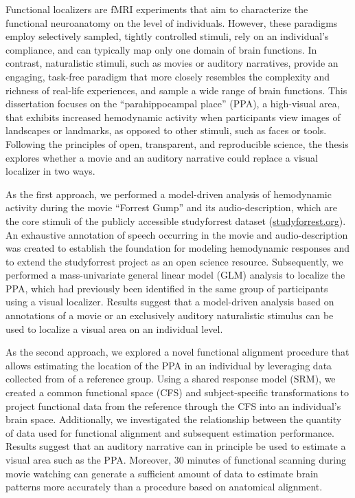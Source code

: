 
Functional localizers are fMRI experiments that aim to characterize the
functional neuroanatomy on the level of individuals.
%
However, these paradigms employ selectively sampled, tightly controlled
stimuli, rely on an individual's compliance, and can typically map only one
domain of brain functions.
In contrast, naturalistic stimuli, such as movies or auditory narratives,
provide an engaging, task-free paradigm that more closely resembles the
complexity and richness of real-life experiences, and sample a wide range of
brain functions.
This dissertation focuses on the ``parahippocampal place'' (PPA), a high-visual
area, that exhibits increased hemodynamic activity when participants view
images of landscapes or landmarks, as opposed to other stimuli, such as faces
or tools.
Following the principles of open, transparent, and reproducible science, the
thesis explores whether a movie and an auditory narrative could replace a
visual localizer in two ways.

As the first approach, we performed a model-driven analysis of hemodynamic
activity during the movie ``Forrest Gump'' and its audio-description, which are
the core stimuli of the publicly accessible studyforrest dataset
(\href{www.studyforrest.org}{\url{studyforrest.org}}).
%
An exhaustive annotation of speech occurring in the movie and audio-description
was created to establish the foundation for modeling hemodynamic responses and
to extend the studyforrest project as an open science resource.
Subsequently, we performed a mass-univariate general linear model (GLM)
analysis to localize the PPA, which had previously been identified in the same
group of participants using a visual localizer.
Results suggest that a model-driven analysis based on annotations of a movie or
an exclusively auditory naturalistic stimulus can be used to localize a visual
area on an individual level.

As the second approach, we explored a novel functional alignment procedure that
allows estimating the location of the PPA in an individual by leveraging data
collected from of a reference group.
%
Using a shared response model (SRM), we created a common functional space (CFS)
and subject-specific transformations to project functional data from the
reference through the CFS into an individual's brain space.
%
Additionally, we investigated the relationship between the quantity of data
used for functional alignment and subsequent estimation performance.
%
Results suggest that an auditory narrative can in principle be used to estimate
a visual area such as the PPA.
%
Moreover, 30 minutes of functional scanning during movie watching can generate
a sufficient amount of data to estimate brain patterns more accurately than a
procedure based on anatomical alignment.

